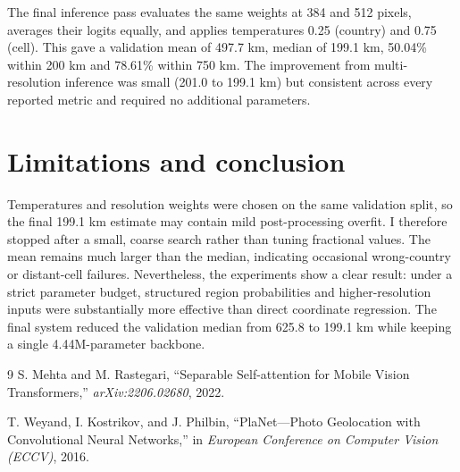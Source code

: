 \documentclass[10pt]{article}
\begin{document}
The final inference pass evaluates the same weights at 384 and 512 pixels,
averages their logits equally, and applies temperatures 0.25 (country) and 0.75
(cell). This gave a validation mean of 497.7 km, median of 199.1 km, 50.04\%
within 200 km and 78.61\% within 750 km. The improvement from multi-resolution
inference was small (201.0 to 199.1 km) but consistent across every reported
metric and required no additional parameters.

\section*{Limitations and conclusion}

Temperatures and resolution weights were chosen on the same validation split,
so the final 199.1 km estimate may contain mild post-processing overfit. I
therefore stopped after a small, coarse search rather than tuning fractional
values. The mean remains much larger than the median, indicating occasional
wrong-country or distant-cell failures. Nevertheless, the experiments show a
clear result: under a strict parameter budget, structured region probabilities
and higher-resolution inputs were substantially more effective than direct
coordinate regression. The final system reduced the validation median from
625.8 to 199.1 km while keeping a single 4.44M-parameter backbone.

\begin{thebibliography}{9}
\small
{}
S. Mehta and M. Rastegari,
``Separable Self-attention for Mobile Vision Transformers,''
\emph{arXiv:2206.02680}, 2022.

T. Weyand, I. Kostrikov, and J. Philbin,
``PlaNet---Photo Geolocation with Convolutional Neural Networks,''
in \emph{European Conference on Computer Vision (ECCV)}, 2016.
\end{thebibliography}
\end{document}

